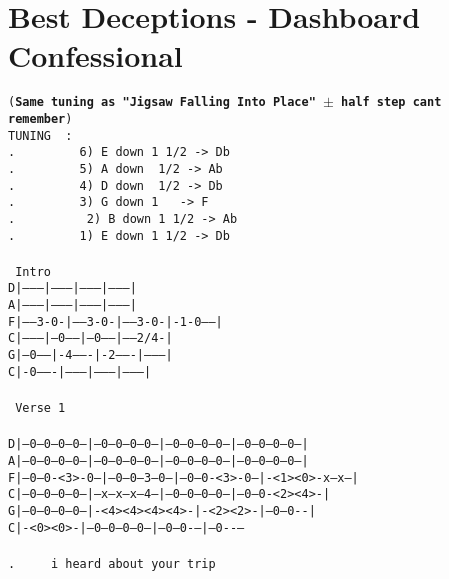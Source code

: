 \newpage
\section{Best Deceptions - Dashboard Confessional}
\label{Best Deceptions - Dashboard Confessional}
\texttt{({\bf Same\ tuning\ as\ "Jigsaw\ Falling\ Into\ Place" $\pm$ half step cant remember})\\
TUNING\ \ :\\
. \ \ \ \ \ \ \ \ 6)\ E\ down\ 1 1/2\ ->\ Db\\
. \ \ \ \ \ \ \ \ 5)\ A\ down\ \ 1/2\ ->\ Ab\\
. \ \ \ \ \ \ \ \ 4)\ D\ down\ \ 1/2\ ->\ Db\\
. \ \ \ \ \ \ \ \ 3)\ G\ down\ 1\ \ \   ->\ F\\
. \ \ \ \ \ \ \ \ \ 2)\ B\ down\ 1 1/2\ ->\ Ab\\
. \ \ \ \ \ \ \ \ 1)\ E\ down\ 1 1/2\ ->\ Db\\
\\
\lbrack\ Intro\rbrack\\
D|---------|---------|---------|---------|\\
A|---------|---------|---------|---------|\\
F|-----3-0-|-----3-0-|-----3-0-|-1-0-----|\\
C|---------|---0-----|---0-----|-----2/4-|\\
G|---0-----|-4-------|-2-------|---------|\\
C|-0-------|---------|---------|---------|\\
\\
\lbrack\ Verse\ 1\rbrack\\
\\
D|--0--0--0--0--|--0--0--0--0--|--0--0--0--0--|--0--0--0--0--|\\
A|--0--0--0--0--|--0--0--0--0--|--0--0--0--0--|--0--0--0--0--|\\
F|--0--0-<3>-0--|--0--0--3--0--|--0--0-<3>-0--|-<1><0>-x--x--|\\
C|--0--0--0--0--|--x--x--x--4--|--0--0--0--0--|--0--0-<2><4>-|\\
G|--0--0--0--0--|-<4><4><4><4>-|-<2><2>-|--0--0-\rbrack{}\rbrack-|\\
C|-<0><0>-|--0--0--0--0--|--0--0---|--0--\rbrack--\\
\\
. \ \ \ \ i\ heard\ about\ your\ trip\\
}
